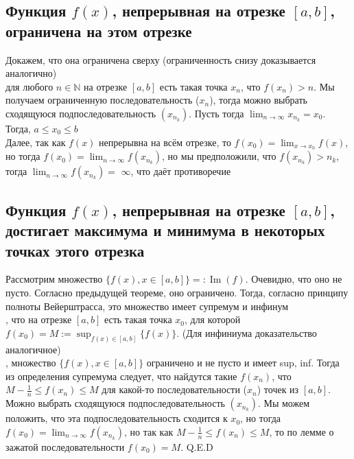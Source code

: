 \documentclass[a4paper]{article}
\begin{document}
\subsection{Функция $f(x)$, непрерывная на отрезке $[a, b]$, ограничена на этом отрезке}

Докажем, что она ограничена сверху (ограниченность снизу доказывается аналогично)\\[2mm]
 для любого $n \in \mathbb{N}$ на отрезке $[a, b]$ есть такая точка $x_n$, что $f\left(x_n\right)>n$. Мы получаем ограниченную последовательность ($x_n$), тогда можно выбрать сходящуюся подпоследовательность $\left(x_{n_k}\right)$. Пусть тогда $\lim _{n \rightarrow \infty} x_{n_k}=x_0$. Тогда, $a \leq x_0 \leq b$\\[2mm]
\indent Далее, так как $f(x)$ непрерывна на всём отрезке, то $f\left(x_0\right)=\lim _{x \rightarrow x_0} f(x)$, но тогда $f\left(x_0\right)=\lim _{n \rightarrow \infty} f\left(x_{n_k}\right)$, но мы предположили, что $f\left(x_{n_k}\right)>n_k$, тогда $\lim _{n \rightarrow \infty} f\left(x_{n_k}\right)=$ $\infty$, что даёт противоречие




\subsection{Функция $f(x)$, непрерывная на отрезке $[a, b]$, достигает максимума и минимума в некоторых точках этого отрезка}
Рассмотрим множество $\{f(x), x \in[a, b]\}=: \operatorname{Im}(f)$. Очевидно, что оно не пусто. Согласно предыдущей теореме, оно ограничено. Тогда, согласно принципу полноты Вейерштрасса, это множество имеет супремум и инфинум\\[2mm]
, что на отрезке $[a, b]$ есть такая точка $x_0$, для которой $f\left(x_0\right)=M:=\sup _{f(x) \in[a, b]}\{f(x)\}$. (Для инфиниума доказательство аналогичное)\\[2mm]
, множество $\{f(x), x \in[a, b]\}$ ограничено и не пусто и имеет sup, inf. Тогда из определения супремума следует, что найдутся такие $f\left(x_n\right)$, что $M-\frac{1}{n} \leq f\left(x_n\right) \leq M$ для какой-то последовательности ($x_n$) точек из $[a, b]$. Можно выбрать сходящуюся подпоследовательность $\left(x_{n_k}\right)$. Мы можем положить, что эта подпоследовательность сходится к $x_0$, но тогда $f\left(x_0\right)=\lim _{n \rightarrow \infty} f\left(x_{n_k}\right)$, но так как $M-\frac{1}{n} \leq f\left(x_n\right) \leq M$, то по лемме о зажатой последовательности $f\left(x_0\right)=M$. Q.E.D
\end{document}
